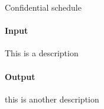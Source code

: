 



\makeheader

Confidential schedule

\paragraph*{Input}

This is a description

\paragraph*{Output}

this is another description

\begin{samples}
\end{samples}


